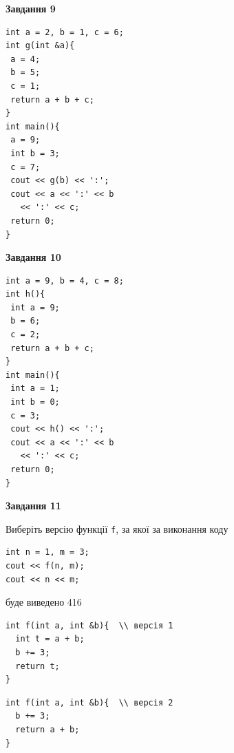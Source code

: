 \documentclass[12pt, ukrainian]{article}
\def\code#1{\Verb!#1!}
\begin{document}
{\begin {large}
\begin{minipage}[t]{11.0cm}
\end{minipage}


\begin{minipage}[t]{7.0cm}

\begin{center}
\textbf{Завдання 9}
\end{center}
\vspace{-8mm}

\begin{verbatim}
int a = 2, b = 1, c = 6;
int g(int &a){
 a = 4;
 b = 5;
 c = 1;
 return a + b + c;
}
int main(){
 a = 9;
 int b = 3;
 c = 7;
 cout << g(b) << ':';
 cout << a << ':' << b 
   << ':' << c;
 return 0;
}
\end{verbatim}



\begin{center}
\textbf{Завдання 10}
\end{center}
\vspace{-8mm}

\begin{verbatim}
int a = 9, b = 4, c = 8;
int h(){
 int a = 9;
 b = 6;
 c = 2;
 return a + b + c;
}
int main(){
 int a = 1;
 int b = 0;
 c = 3;
 cout << h() << ':';
 cout << a << ':' << b 
   << ':' << c;
 return 0;
}
\end{verbatim}

\end{minipage}
\vline \hspace{1mm}
\begin{minipage}[t]{11.0cm}

\begin{center}
\textbf{Завдання 11}
\end{center}
Виберіть версію функції \code{f}, за якої за виконання коду
\begin{verbatim}
int n = 1, m = 3;
cout << f(n, m);
cout << n << m;
\end{verbatim}

буде виведено 416

\begin{verbatim}
int f(int a, int &b){  \\ версія 1
  int t = a + b;
  b += 3;
  return t;
}
\end{verbatim}

\vspace{-8mm}\begin{verbatim}
int f(int a, int &b){  \\ версія 2
  b += 3;
  return a + b;
}
\end{verbatim}


\end{minipage}
\end{large}}
\end{document}
